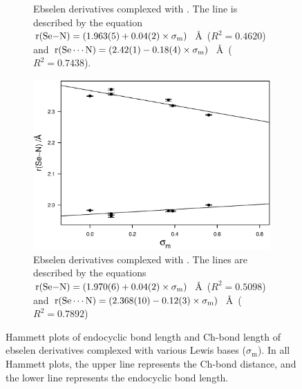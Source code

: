 \begin{refsection}
\begin{figure}
\begin{subfigure}[t]{0.45\linewidth}
\caption{Ebselen derivatives complexed with . The line is described by the equation $\mathrm{r}(\ce{Se-N}) = (1.963(5) + 0.04(2) \times \sigma_\text{m})$~\AA~($R^2=0.4620$) and $\mathrm{r}(\ce{Se\cdots N}) = (2.42(1) - 0.18(4) \times \sigma_\text{m})$~\AA~($R^2=0.7438$).}\label{fig:hammett-morph-meta}
\end{subfigure}
\hfill
\begin{subfigure}[t]{0.45\linewidth}
  \centering
\includegraphics[width=\linewidth]{Figures/hammett-pyrrol-m.eps}
\caption{Ebselen derivatives complexed with . The lines are described by the equations $\mathrm{r}(\ce{Se-N}) = (1.970(6) + 0.04(2) \times \sigma_\text{m})$~\AA~($R^2=0.5098$) and $\mathrm{r}(\ce{Se\cdots N}) = (2.368(10) - 0.12(3) \times \sigma_\text{m})$~\AA~($R^2=0.7892$)}\label{fig:hammett-pyrrol-meta}
\end{subfigure}
\caption[Hammett plots of endocyclic  bond length and  Ch-bond length of ebselen derivatives complexed with various Lewis bases ($\sigma_\text{m}$).]{Hammett plots of endocyclic  bond length and  Ch-bond length of ebselen derivatives complexed with various Lewis bases ($\sigma_\text{m}$). In all Hammett plots, the upper line represents the  Ch-bond distance, and the lower line represents the endocyclic  bond length.}
\end{figure}


\end{refsection}

